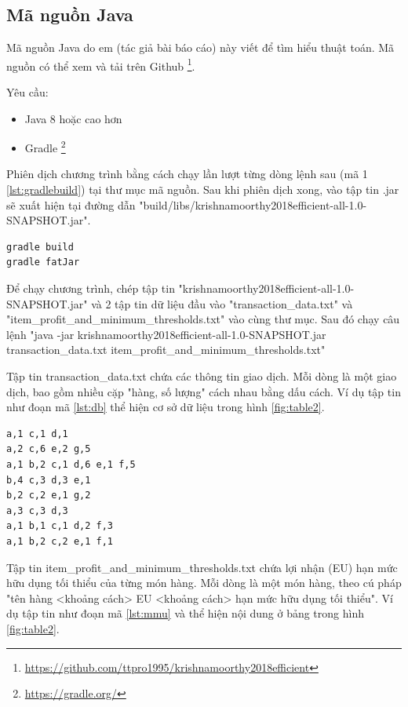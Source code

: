 

\subsection{Mã nguồn Java}

Mã nguồn Java do em (tác giả bài báo cáo) này viết để tìm hiểu thuật toán. Mã nguồn có thể xem và tải trên Github \footnote{\url{https://github.com/ttpro1995/krishnamoorthy2018efficient}}. 

Yêu cầu: 
\begin{itemize}
  \item Java 8 hoặc cao hơn 
  \item Gradle \footnote{\url{https://gradle.org/}}
\end{itemize}

Phiên dịch chương trình bằng cách chạy lần lượt từng dòng lệnh sau (mã 1 \ref{lst:gradlebuild}) tại thư mục mã nguồn. Sau khi phiên dịch xong, vào tập tin .jar sẽ xuất hiện tại đường dẫn  "build/libs/krishnamoorthy2018efficient-all-1.0-SNAPSHOT.jar". 

\begin{lstlisting}[caption={Câu lệnh phiên dịch chương trình}, label={lst:gradlebuild}, language=bash]
gradle build
gradle fatJar
\end{lstlisting}

Để chạy chương trình, chép tập tin "krishnamoorthy2018efficient-all-1.0-SNAPSHOT.jar" và 2 tập tin dữ liệu đầu vào "transaction\_data.txt" và "item\_profit\_and\_minimum\_thresholds.txt" vào cùng thư mục. Sau đó chạy câu lệnh "java -jar krishnamoorthy2018efficient-all-1.0-SNAPSHOT.jar transaction\_data.txt item\_profit\_and\_minimum\_thresholds.txt"

Tập tin transaction\_data.txt chứa các thông tin giao dịch. Mỗi dòng là một giao dịch, bao gồm nhiều cặp "hàng, số lượng" cách nhau bằng dấu cách. Ví dụ tập tin như đoạn mã \ref{lst:db} thể hiện cơ sở dữ liệu trong hình \ref{fig:table2}.

\begin{lstlisting}[caption={tập tin transaction\_data.txt}, label={lst:db}, language=bash]
a,1 c,1 d,1
a,2 c,6 e,2 g,5
a,1 b,2 c,1 d,6 e,1 f,5
b,4 c,3 d,3 e,1
b,2 c,2 e,1 g,2
a,3 c,3 d,3
a,1 b,1 c,1 d,2 f,3
a,1 b,2 c,2 e,1 f,1
\end{lstlisting}

Tập tin item\_profit\_and\_minimum\_thresholds.txt chứa lợi nhận (EU) hạn mức hữu dụng tối thiểu của từng món hàng. Mỗi dòng là một món hàng, theo cú pháp "tên hàng <khoảng cách> EU <khoảng cách> hạn mức hữu dụng tối thiểu". Ví dụ tập tin như đoạn mã \ref{lst:mmu} và thể hiện nội dung ở bảng trong hình \ref{fig:table2}.

